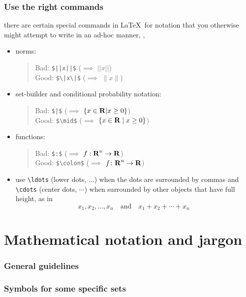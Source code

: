 \documentclass[usepdftitle=false]{beamer}
\begin{document}
\begin{frame}[fragile]
    \frametitle{Use the right commands}

    there are certain special commands in \LaTeX\ for notation that you otherwise might attempt to write in an ad-hoc manner, \eg,
    \begin{itemize}\itemsep=12pt
        \item norms: 
            \begin{quote}
                Bad: \verb+$||x||$+ ($\implies$ $||x||$)\\
                Good: \verb+$\|x\|$+ ($\implies$ $\|x\|$)
            \end{quote}
        \item set-builder and conditional probability notation:
            \begin{quote}
                Bad: \verb+$|$+ ($\implies$ $\{x \in {\bf R{}} | x \geq 0 \}$)\\
                Good: \verb+$\mid$+ ($\implies$ $\{ x \in {\bf R{}} \mid x \geq 0 \}$)
            \end{quote}
        \item functions:
            \begin{quote}
                Bad: \verb+$:$+ ($\implies$ $f: {\bf R{}}^n \to {\bf R{}}$)\\
                Good: \verb+$\colon$+ ($\implies$ $f \colon {\bf R{}}^n \to {\bf R{}}$)
            \end{quote}
        \item use \verb+\ldots+ (lower dots, $\ldots$) when the dots are surrounded by commas and \verb+\cdots+ (center dots, $\cdots$) when surrounded by other objects that have full height, as in
        \[
            x_1, x_2, \ldots, x_n\quad \mbox{and}\quad x_1 + x_2 + \cdots + x_n
        \]
    \end{itemize}
\end{frame}

\section{Mathematical notation and jargon}
\begin{frame}
    \frametitle{General guidelines}

    

\end{frame}

\begin{frame}
    \frametitle{Symbols for some specific sets}

    

\end{frame}
\end{document}
